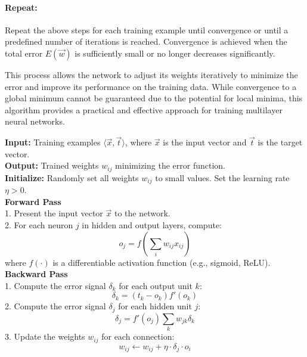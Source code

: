 \documentclass{tufte-handout}
\begin{document}
\paragraph{Repeat:}
Repeat the above steps for each training example until convergence or until a predefined number of iterations is reached. Convergence is achieved when the total error $E(\Vec{w})$ is sufficiently small or no longer decreases significantly.

This process allows the network to adjust its weights iteratively to minimize the error and improve its performance on the training data. While convergence to a global minimum cannot be guaranteed due to the potential for local minima, this algorithm provides a practical and effective approach for training multilayer neural networks.

\begin{algorithm}[h]
    \caption{Backpropagation Algorithm}
        \textbf{Input:} Training examples $\langle \Vec{x}, \Vec{t} \rangle$, where $\Vec{x}$ is the input vector and $\Vec{t}$ is the target vector. \\
        \textbf{Output:} Trained weights $w_{ij}$ minimizing the error function. \\
        \textbf{Initialize:} Randomly set all weights $w_{ij}$ to small values. Set the learning rate $\eta > 0$. \\
        
        \textbf{Forward Pass} \\
        1. Present the input vector $\Vec{x}$ to the network. \\
        2. For each neuron $j$ in hidden and output layers, compute: \\
        \begin{equation*}
            o_j = f\left(\sum_i w_{ij} x_{ij}\right)
        \end{equation*}
        where $f(\cdot)$ is a differentiable activation function (e.g., sigmoid, ReLU). \\
        
        \textbf{Backward Pass} \\
        1. Compute the error signal $\delta_k$ for each output unit $k$: \\
        \begin{equation*}
            \delta_k = (t_k - o_k) f'(o_k)
        \end{equation*}
        2. Compute the error signal $\delta_j$ for each hidden unit $j$: \\
        \begin{equation*}
            \delta_j = f'(o_j) \sum_k w_{jk} \delta_k
        \end{equation*}
        3. Update the weights $w_{ij}$ for each connection: \\
        \begin{equation*}
            w_{ij} \leftarrow w_{ij} + \eta \cdot \delta_j \cdot o_i
        \end{equation*}


\end{algorithm}
\end{document}
